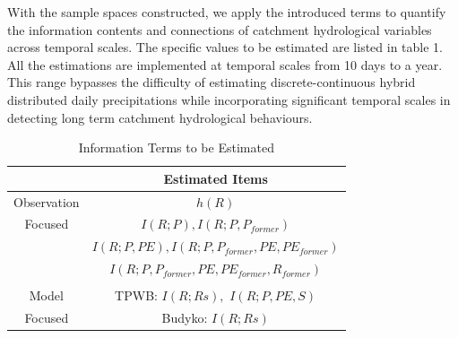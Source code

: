 \documentclass[draft,wrr]{AGUTeX}
\begin{document}
\begin{article}
 


With the sample spaces constructed,
we apply the introduced terms to quantify the information contents and connections of catchment hydrological variables across temporal scales. The specific values to be estimated are listed in table 1. All the estimations are implemented at temporal scales from 10 days to a year. This range  bypasses the difficulty of estimating discrete-continuous hybrid distributed daily precipitations\citep{gong2014estimating} while incorporating significant temporal scales in detecting long term catchment hydrological behaviours. 

\begin{table}[H] 
\caption{Information Terms to be Estimated}
\begin{tabular}{cc}
\hline
   &  Estimated Items \\
\hline
 Observation   &$h(R)$ \\
Focused 
 &$I(R;P),I(R;P,P_{former})$\\
 &
$I(R;P,PE),I(R;P,P_{former},PE,PE_{former})$\\
 &
$I(R;P,P_{former}, PE,PE_{former},R_{former})$\\
\\
Model  & TPWB: $I(R;Rs),$ $I(R;P,PE,S)$  \\
Focused & Budyko:  $I(R;Rs)$\\
\hline
\end{tabular}
\end{table}



\end{article}
\end{document}
